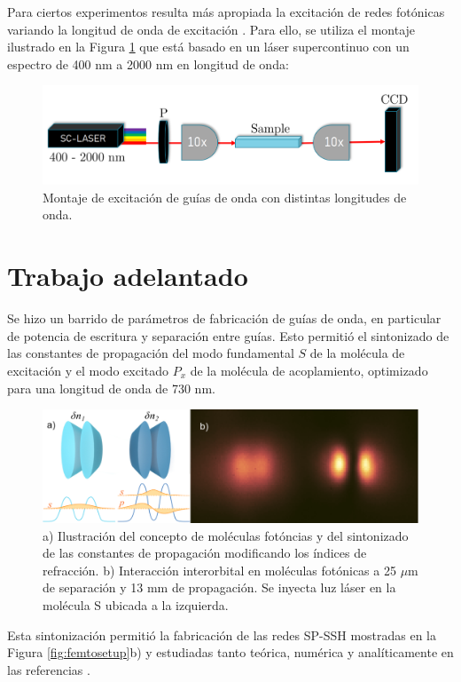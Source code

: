 \documentclass{article}
\begin{document}
Para ciertos experimentos resulta más apropiada la excitación de redes fotónicas variando la longitud de onda de excitación \cite{spectraltransfer, SPSSH}. Para ello, se utiliza el montaje ilustrado en la Figura \ref{fig:supercontinuum} que está basado en un láser supercontinuo con un espectro de 400 nm a 2000 nm en longitud de onda:

\begin{figure}[H]
	\centering
	\includegraphics[width=0.5\linewidth]{./media/supercontinuum.png}
	\caption{Montaje de excitación de guías de onda con distintas longitudes de onda.\label{fig:supercontinuum}}
\end{figure}


\section{Trabajo adelantado}

Se hizo un barrido de parámetros de fabricación de guías de onda, en particular de potencia de escritura y separación entre guías. Esto permitió el sintonizado de las constantes de propagación del modo fundamental $S$ de la molécula de excitación y el modo excitado $P_x$ de la molécula de acoplamiento, optimizado para una longitud de onda de 730 nm.


\begin{figure}[H]
	\centering
	\includegraphics[width=0.7\linewidth]{./media/detuningv2.png}
	\caption{a) Ilustración del concepto de moléculas fotóncias y del sintonizado de las constantes de propagación modificando los índices de refracción. b) Interacción interorbital en moléculas fotónicas a 25 $\mu$m de separación y 13 mm de propagación. Se inyecta luz láser en la molécula S ubicada a la izquierda.}
\end{figure}

Esta sintonización permitió la fabricación de las redes SP-SSH mostradas en la Figura \ref{fig:femtosetup}b) y estudiadas tanto teórica, numérica y analíticamente en las referencias \cite{toporusos, topo1dphoto, SPSSH}.
\end{document}
